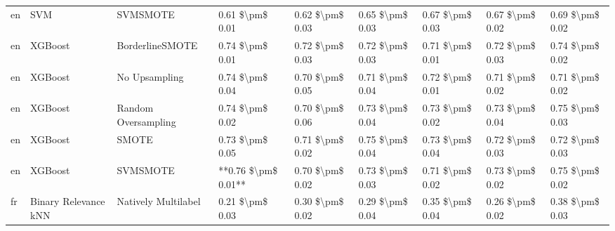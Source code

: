 \begin{tabular}{lllllllll}
      en &                             SVM &                      SVMSMOTE &     0.61 \$\textbackslash pm\$ 0.01 &           0.62 \$\textbackslash pm\$ 0.03 &       0.65 \$\textbackslash pm\$ 0.03 &        0.67 \$\textbackslash pm\$ 0.03 &                         0.67 \$\textbackslash pm\$ 0.02 &     0.69 \$\textbackslash pm\$ 0.02 \\
      en &                         XGBoost &               BorderlineSMOTE &     0.74 \$\textbackslash pm\$ 0.01 &           0.72 \$\textbackslash pm\$ 0.03 &       0.72 \$\textbackslash pm\$ 0.03 &        0.71 \$\textbackslash pm\$ 0.01 &                         0.72 \$\textbackslash pm\$ 0.03 &     0.74 \$\textbackslash pm\$ 0.02 \\
      en &                         XGBoost &                 No Upsampling &     0.74 \$\textbackslash pm\$ 0.04 &           0.70 \$\textbackslash pm\$ 0.05 &       0.71 \$\textbackslash pm\$ 0.04 &        0.72 \$\textbackslash pm\$ 0.01 &                         0.71 \$\textbackslash pm\$ 0.02 &     0.71 \$\textbackslash pm\$ 0.02 \\
      en &                         XGBoost &           Random Oversampling &     0.74 \$\textbackslash pm\$ 0.02 &           0.70 \$\textbackslash pm\$ 0.06 &       0.73 \$\textbackslash pm\$ 0.04 &        0.73 \$\textbackslash pm\$ 0.02 &                         0.73 \$\textbackslash pm\$ 0.04 &     0.75 \$\textbackslash pm\$ 0.03 \\
      en &                         XGBoost &                         SMOTE &     0.73 \$\textbackslash pm\$ 0.05 &           0.71 \$\textbackslash pm\$ 0.02 &       0.75 \$\textbackslash pm\$ 0.04 &        0.73 \$\textbackslash pm\$ 0.04 &                         0.72 \$\textbackslash pm\$ 0.03 &     0.72 \$\textbackslash pm\$ 0.03 \\
      en &                         XGBoost &                      SVMSMOTE & **0.76 \$\textbackslash pm\$ 0.01** &           0.70 \$\textbackslash pm\$ 0.02 &       0.73 \$\textbackslash pm\$ 0.03 &        0.71 \$\textbackslash pm\$ 0.02 &                         0.73 \$\textbackslash pm\$ 0.02 &     0.75 \$\textbackslash pm\$ 0.02 \\
      fr &            Binary Relevance kNN &           Natively Multilabel &     0.21 \$\textbackslash pm\$ 0.03 &           0.30 \$\textbackslash pm\$ 0.02 &       0.29 \$\textbackslash pm\$ 0.04 &        0.35 \$\textbackslash pm\$ 0.04 &                         0.26 \$\textbackslash pm\$ 0.02 &     0.38 \$\textbackslash pm\$ 0.03 \\

\end{tabular}

